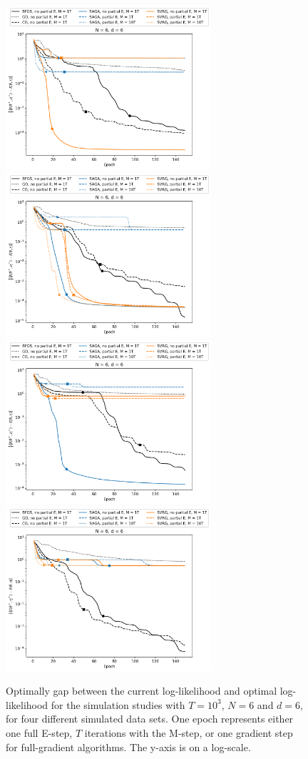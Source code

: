 \documentclass{article}
\begin{document}
%
\begin{figure}
    \centering
    \includegraphics[width=3in]{../plt/log-like_v_epoch_T-1000-K-6-1-d-6-001.png}
    \includegraphics[width=3in]{../plt/log-like_v_epoch_T-1000-K-6-1-d-6-002.png}
    \\
    \includegraphics[width=3in]{../plt/log-like_v_epoch_T-1000-K-6-1-d-6-003.png}
    \includegraphics[width=3in]{../plt/log-like_v_epoch_T-1000-K-6-1-d-6-004.png}   
    \caption{Optimally gap between the current log-likelihood and optimal log-likelihood for the simulation studies with $T=10^{3}$, $N=6$ and $d=6$, for four different simulated data sets. One epoch represents either one full E-step, $T$ iterations with the M-step, or one gradient step for full-gradient algorithms. The y-axis is on a log-scale.}
\end{figure}
\end{document}
